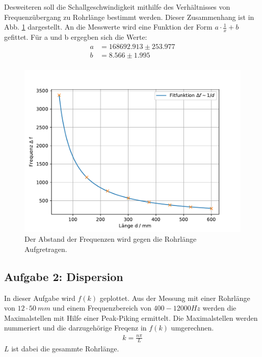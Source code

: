 \FloatBarrier
Desweiteren soll die Schallgeschwindigkeit mithilfe des Verhältnisses von Frequenzübergang zu Rohrlänge bestimmt werden.
Dieser Zusammenhang ist in Abb. \ref{fig.1/x} dargestellt.
An die Messwerte wird eine Funktion der Form $a\cdot\frac{1}{x}+b$ gefittet.
Für a und b ergegben sich die Werte:
\begin{align*}
  a&=168692.913\pm253.977\\
  b&=8.566\pm1.995\\
\end{align*}
\begin{figure}[h!]
  \centering
  \includegraphics[width=\textwidth]{geschi.pdf}
  \caption{Der Abstand der Frequenzen wird gegen die Rohrlänge Aufgretragen.}
  \label{fig.1/x}
\end{figure}
\FloatBarrier

\subsection{Aufgabe 2: Dispersion}
In dieser Aufgabe wird $f(k)$ geplottet.
Aus der Messung mit einer Rohrlänge von $12\cdot\SI{50}{mm}$ und einem Frequenzbereich von $400-12000\si{Hz}$ werden die Maximalstellen mit Hilfe einer Peak-Piking ermittelt.
Die Maximalstellen werden nummeriert und die darzugehörige Freqenz in $f(k)$ umgerechnen.
\begin{align}
  k= \frac{n \pi}{L}
\end{align}
$L$ ist dabei die gesammte Rohrlänge.

